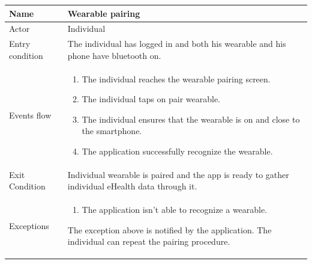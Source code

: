\begin{tabular}{|l|p{11cm}|}
    \hline
    Name & Wearable pairing
    \\ \hline
    Actor & Individual
    \\ \hline 
    Entry condition & The individual has logged in and both his wearable and his phone have bluetooth on.
    \\ \hline
    Events flow &
    \begin{enumerate}
    \item The individual reaches the wearable pairing screen.
    \item The individual taps on pair wearable.
    \item The individual ensures that the wearable is on and close to the smartphone.
    \item The application successfully recognize the wearable.
    \end{enumerate}
     \\ \hline
     Exit Condition & Individual wearable is paired and the app is ready to gather individual eHealth data through it.
     \\
    \hline
    Exceptions &
        \begin{enumerate}
    \item The application isn't able to recognize a wearable. 
   
    \end{enumerate}
    The exception above is notified by the application. The individual can repeat the pairing procedure.
      \\
    \hline

\end{tabular}



